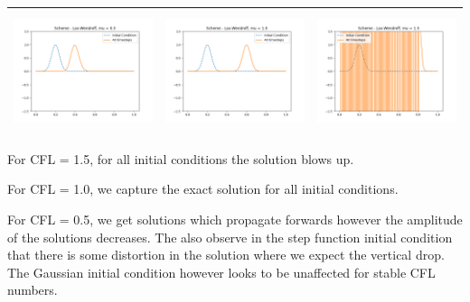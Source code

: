 \documentclass[a4paper,twoside,11pt]{article}
\begin{document}
\begin{table}[!h]
\begin{tabular}{ | c | m{5cm} | m{5cm} | }
            \begin{minipage}{.3\textwidth}
              \includegraphics[width=\linewidth, height=3.5cm]{../plots/scheme4-IC5-mu0_5.png}
            \end{minipage}
            &
            \begin{minipage}{.3\textwidth}
              \includegraphics[width=\linewidth, height=3.5cm]{../plots/scheme4-IC5-mu1_0.png}
            \end{minipage}
            &
            \begin{minipage}{.3\textwidth}
              \includegraphics[width=\linewidth, height=3.5cm]{../plots/scheme4-IC5-mu1_5.png}
            \end{minipage} \\
            \hline
          \end{tabular}
        \end{table}

    For CFL = 1.5, for all initial conditions the solution blows up.

    For CFL = 1.0, we capture the exact solution for all initial conditions.

    For CFL = 0.5, we get solutions which propagate forwards however the amplitude of the solutions decreases. The also observe in the step function initial condition that there is some distortion in the solution where we expect the vertical drop. The Gaussian initial condition however looks to be unaffected for stable CFL numbers.
\end{document}
